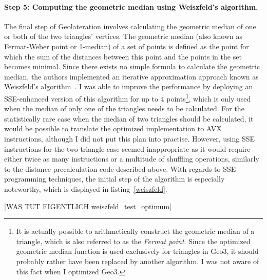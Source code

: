 \paragraph{Step 5: Computing the geometric median using Weiszfeld's algorithm.} The final step of Geolateration involves calculating the geometric median of one or both of the two triangles' vertices. The geometric median (also known as Fermat-Weber point or 1-median) of a set of points is defined as the point for which the sum of the distances between this point and the points in the set becomes minimal. Since there exists no simple formula to calculate the geometric median, the authors implemented an iterative approximation approach known as Weiszfeld's algorithm~\cite{weiszfeld2009minimum}. I was able to improve the performance by deploying an SSE-enhanced version of this algorithm for up to 4 points\footnote{It is actually possible to arithmetically construct the geometric median of a triangle, which is also referred to as the \emph{Fermat point}. Since the optimized geometric median function is used exclusively for triangles in Geo3, it should probably rather have been replaced by another algorithm. I was not aware of this fact when I optimized Geo3.}, which is only used when the median of only one of the triangles needs to be calculated. For the statistically rare case when the median of two triangles should be calculated, it would be possible to translate the optimized implementation to AVX instructions, although I did not put this plan into practise. However, using SSE instructions for the two triangle case seemed inappropriate as it would require either twice as many instructions or a multitude of shuffling operations, similarly to the distance precalculation code described above. With regards to SSE programming techniques, the initial step of the algorithm is especially noteworthy, which is displayed in listing~\ref{weiszfeld}. 

[WAS TUT EIGENTLICH weiszfeld\_test\_optimum] 

